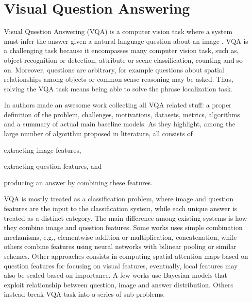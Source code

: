\section{Visual Question Answering}
\label{sec:vqa}

Visual Question Answering (VQA) is a computer vision task where a
system must infer the answer given a natural language question about
an image \cite{kafle2017visual}. VQA is a challenging task because it
encompasses many computer vision task, such as, object recognition or
detection, attribute or scene classification, counting and so on.
Moreover, questions are arbitrary, for example questions about spatial
relationships among objects or common sense reasoning may be asked.
Thus, solving the VQA task means being able to solve the phrase
localization task.

In \cite{kafle2017visual} authors made an awesome work collecting all
VQA related stuff: a proper definition of the problem, challenges,
motivations, datasets, metrics, algorithms and a summary of actual
main baseline models. As they highlight, among the large number of
algorithm proposed in literature, all consists of
\begin{enumerate*}[label=(\roman*)] 
  \item extracting image features,
  \item extracting question features, and
  \item producing an answer by combining these features.
\end{enumerate*}
VQA is mostly treated as a classification problem, where image and
question features are the input to the classification system, while
each unique answer is treated as a distinct category. The main
difference among existing systems is how they combine image and
question features. Some works uses simple combination mechanisms,
e.g., elementwise addition or multiplication, concatenation, while
others combine features using neural networks with bilinear pooling or
similar schemes. Other approaches consists in computing spatial
attention maps based on question features for focusing on visual
features, eventually, local features may also be scaled based on
importance. A few works use Bayesian models that exploit relationship
between question, image and answer distribution. Others instead break
VQA task into a series of sub-problems.
